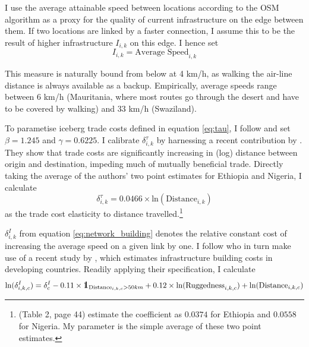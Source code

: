 \documentclass[11pt, oneside]{article}   	%
\def\one{\mbox{1\hspace{-4.25pt}\fontsize{12}{14.4}\selectfont\textrm{1}}} %
\begin{document}
I use the average attainable speed between locations according to the OSM algorithm as a proxy for the quality of current infrastructure on the edge between them. If two locations are linked by a faster connection, I assume this to be the result of higher infrastructure $I_{i,k}$ on this edge. I hence set
\begin{equation}
  I_{i,k} = \textrm{Average Speed}_{i,k}
\end{equation}

This measure is naturally bound from below at 4 km/h, as walking the air-line distance is always available as a backup. Empirically, average speeds range between 6 km/h (Mauritania, where most routes go through the desert and have to be covered by walking) and 33 km/h (Swaziland).

To parametise iceberg trade costs defined in equation \eqref{eq:tau}, I follow \citeauthor{Fajgelbaum_OptimalTransportNetworks_2017} and set $\beta = 1.245$ and $\gamma = 0.6225$. I calibrate $\delta^{\tau}_{i, k}$ by harnessing a recent contribution by \cite{Atkin_WhoGettingGlobalized_2015}. They show that trade costs are significantly increasing in (log) distance between origin and destination, impeding much of mutually beneficial trade. Directly taking the average of the authors' two point estimates for Ethiopia and Nigeria, I calculate
\begin{equation}
  \delta^{\tau}_{i,k} =  0.0466\times\textrm{ln}(\textrm{Distance}_{i,k})
  \label{eq:delta_tau}
\end{equation}
as the trade cost elasticity to distance travelled.\footnote{\citeauthor{Atkin_WhoGettingGlobalized_2015} (Table 2, page 44) estimate the coefficient as $0.0374$ for Ethiopia and $0.0558$ for Nigeria. My parameter is the simple average of these two point estimates.}

$\delta_{i,k}^{I}$ from equation \eqref{eq:network_building} denotes the relative constant cost of increasing the average speed on a given link by one. I follow \citeauthor{Fajgelbaum_OptimalTransportNetworks_2017} who in turn make use of a recent study by \cite{Collier_CostRoadInfrastructure_2015}, which estimates infrastructure building costs in developing countries. Readily applying their specification, I calculate
\begin{equation}
  \textrm{ln}(\delta^{I}_{i,k,c}) = \delta_{c}^{I} - 0.11 \times \one_{\textrm{Distance}_{i,k,c} > 50km} + 0.12 \times \textrm{ln}(\textrm{Ruggedness}_{i,k,c}) + \textrm{ln}(\textrm{Distance}_{i,k,c})
  \label{eq:delta_I}
\end{equation}
\end{document}
